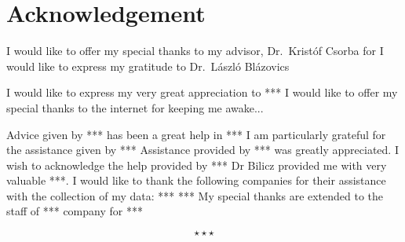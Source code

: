 \chapter*{Acknowledgement}

I would like to offer my special thanks to my advisor, Dr.~Krist{\'o}f Csorba for
I would like to express my gratitude to Dr.~L{\'a}szl{\'o} Bl{\'a}zovics

I would like to express my very great appreciation to ***
I would like to offer my special thanks to the internet for keeping me awake...

Advice given by *** has been a great help in ***
I am particularly grateful for the assistance given by ***
Assistance provided by *** was greatly appreciated.
I wish to acknowledge the help provided by ***
Dr Bilicz provided me with very valuable ***.
I would like to thank the following companies for their assistance with the collection of my data:
***
***
My special thanks are extended to the staff of *** company for ***

\begin{displaymath}
	\star \star \star
\end{displaymath}